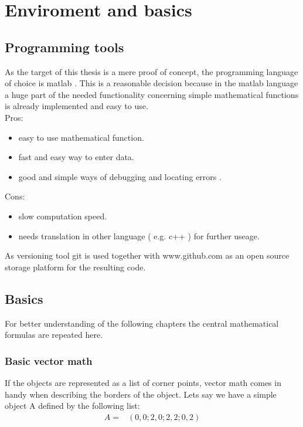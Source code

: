 \chapter{Enviroment and basics}
\label{cha:enviromentandbasics}

\section{Programming tools}
As the target of this thesis is a mere proof of concept, the programming language of choice is matlab \cite{tool:matlab}. This is a reasonable decision because in the matlab language a huge part of the needed functionality concerning simple mathematical functions is already implemented and easy to use. \\
Pros:
\begin{itemize}
\item easy to use mathematical function.
\item fast and easy way to enter data.
\item good and simple ways of debugging and locating errors .
\end{itemize}
Cons:
\begin{itemize}
\item slow computation speed.
\item needs translation in other language ( e.g. c++ ) for further useage.
\end{itemize}

As versioning tool git \cite{tool:git} is used together with www.github.com as an open source storage platform for the resulting code.

\section{Basics}
For better understanding of the following chapters the central mathematical formulas are repeated here.

\subsection{Basic vector math} %
If the objects are represented as a list of corner points, vector math comes in handy when describing the borders of the object.
Lets say we have a simple object A defined by the following list:
\begin{align*}
A = 	&( 0 , 0 ;2 , 0 ;2, 2; 0, 2)	
\end{align*}

